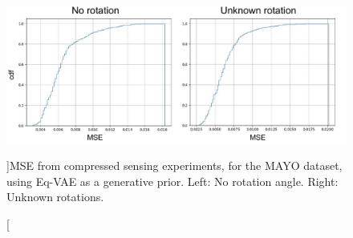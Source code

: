 \begin{figure}[ht!]
    \includegraphics[width=\textwidth]{pics/2_equiv_vae/eqvae_mse.pdf}\hfill
    \caption[][\baselineskip]{MSE from compressed sensing experiments, for the MAYO dataset, using Eq-VAE as a generative prior. Left: No rotation angle. Right: Unknown rotations.}
    \label{fig:mayo_cdf_mse_eqvae}
    \vspace*{\baselineskip}
\end{figure}